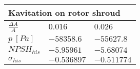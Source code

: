\vspace{20pt}\newline
\begin{tabular}{|l|l|l|}
\multicolumn{3}{l}{Kavitation on rotor shroud} \\ 
\hline
$\frac{\Delta A}{A}$ & $0.016$& $0.026$  \\ 
\hline
$p \ [Pa]$ & $-58358.6$& $-55627.8$  \\ 
\hline
$NPSH_{his}$ & $-5.95961$& $-5.68074$  \\ 
\hline
$\sigma_{his}$ & $-0.536897$& $-0.511774$  \\ 
\hline
\end{tabular}
